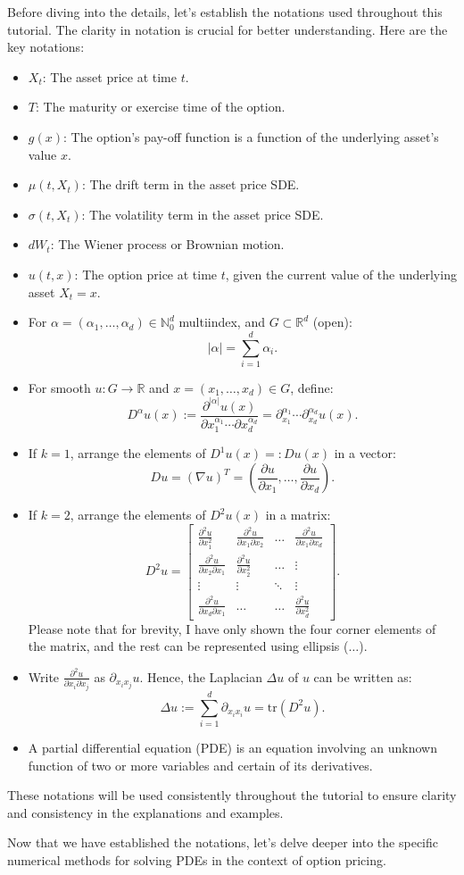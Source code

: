 Before diving into the details, let's establish the notations used throughout this tutorial. The clarity in notation is crucial for better understanding. Here are the key notations:

\begin{itemize}
    \item $X_t$: The asset price at time $t$.
    \item $T$: The maturity or exercise time of the option.
    \item $g(x)$: The option's pay-off function is a function of the underlying asset's value $x$.
    \item $\mu(t, X_t)$: The drift term in the asset price SDE.
    \item $\sigma(t, X_t)$: The volatility term in the asset price SDE.
    \item $dW_t$: The Wiener process or Brownian motion.
    \item $u(t, x)$: The option price at time $t$, given the current value of the underlying asset $X_t = x$.
    \item For $\alpha = (\alpha_1, \ldots, \alpha_d) \in \mathbb{N}_0^d$ multiindex, and $G \subset \mathbb{R}^d$ (open):
    \[|\alpha| = \sum_{i=1}^d \alpha_i.\]
    \item For smooth $u : G \rightarrow \mathbb{R}$ and $x = (x_1, \ldots, x_d) \in G$, define:
    \[D^\alpha u(x) := \frac{{\partial^{|\alpha|} u(x)}}{{\partial x_1^{\alpha_1} \cdots \partial x_d^{\alpha_d}}} = {\partial^{\alpha_1}_{x_1}} \cdots \partial^{\alpha_d}_{x_d} u(x).\]
    \item If $k = 1$, arrange the elements of $D^1 u(x) =: Du(x)$ in a vector:
    \[Du = (\nabla u)^T = \left(\frac{{\partial u}}{{\partial x_1}}, \ldots, \frac{{\partial u}}{{\partial x_d}}\right).\]
    \item If $k = 2$, arrange the elements of $D^2 u(x)$ in a matrix:
    \[D^2 u = \begin{bmatrix}
    \frac{{\partial^2 u}}{{\partial x_1^2}} & \frac{{\partial^2 u}}{{\partial x_1 \partial x_2}} & \ldots & \frac{{\partial^2 u}}{{\partial x_1 \partial x_d}} \\
    \frac{{\partial^2 u}}{{\partial x_2 \partial x_1}} & \frac{{\partial^2 u}}{{\partial x_2^2}} & \ldots & \vdots \\
    \vdots & \vdots & \ddots & \vdots \\
    \frac{{\partial^2 u}}{{\partial x_d \partial x_1}} & \ldots & \ldots & \frac{{\partial^2 u}}{{\partial x_d^2}}
    \end{bmatrix}.\]
    Please note that for brevity, I have only shown the four corner elements of the matrix, and the rest can be represented using ellipsis ($\ldots$).
    \item Write $\frac{{\partial^2 u}}{{\partial x_i \partial x_j}}$ as ${\partial_{x_i x_j} u}$. Hence, the Laplacian $\Delta u$ of $u$ can be written as:
    \[\Delta u := \sum_{i=1}^{d} \partial_{x_i x_i} u = \text{tr}(D^2 u).\]
    \item A partial differential equation (PDE) is an equation involving an unknown function of two or more variables and certain of its derivatives.
\end{itemize}

These notations will be used consistently throughout the tutorial to ensure clarity and consistency in the explanations and examples.

Now that we have established the notations, let's delve deeper into the specific numerical methods for solving PDEs in the context of option pricing.
